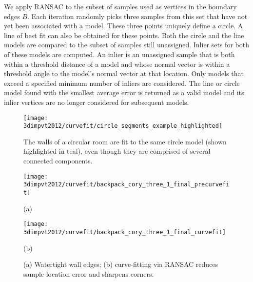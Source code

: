 \documentclass[12pt,onecolumn,oneside]{book}
\begin{document}
We apply RANSAC to the subset of samples used as vertices in the boundary edges $B$.  Each iteration randomly picks three samples from this set that have not yet been associated with a model.  These three points uniquely define a circle.  A line of best fit can also be obtained for these points.  Both the circle and the line models are compared to the subset of samples still unassigned.  Inlier sets for both of these models are computed.  An inlier is an unassigned sample that is both within a threshold distance of a model and whose normal vector is within a threshold angle to the model's normal vector at that location.  Only models that exceed a specified minimum number of inliers are considered.  The line or circle model found with the smallest average error is returned as a valid model and its inlier vertices are no longer considered for subsequent models.

\begin{figure}[t]

\begin{minipage}[b]{1.0\linewidth}
  \centering
  \centerline{\texttt{[image: 3dimpvt2012/curvefit/circle\_segments\_example\_highlighted]}}
\end{minipage}

\caption[Fitting curves to floor plan walls.]{The walls of a circular room are fit to the same circle model (shown highlighted in teal), even though they are comprised of several connected components. }
\label{fig:eigencrust_circle_segments_example}

\end{figure}

\begin{figure}[t]

\begin{minipage}[b]{0.45\linewidth}
  \centering
  \centerline{\texttt{[image: 3dimpvt2012/curvefit/backpack\_cory\_three\_1\_final\_precurvefit]}}
  \centerline{(a)}
\end{minipage}
\hfill
\begin{minipage}[b]{0.45\linewidth}
  \centering
  \centerline{\texttt{[image: 3dimpvt2012/curvefit/backpack\_cory\_three\_1\_final\_curvefit]}}
  \centerline{(b)}
\end{minipage}

\caption[Sharpening floor plan corners with RANASC.]{(a) Watertight wall edges; (b) curve-fitting via RANSAC reduces sample location error and sharpens corners.}
\label{fig:eigencrust_wall_straightening}

\end{figure}
\end{document}
